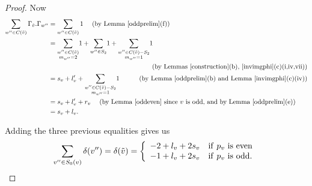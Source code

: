 \begin{proof}
Now
\begin{align*}
 \sum_{w'' \in C({\tilde{v}})} \Gamma_{\tilde{v}}.\Gamma_{w''} 
 &= \sum_{w'' \in C({\tilde{v}})} 1 \ \ \ \ (\mathrm{by \ Lemma~\ref{oddprelim}(f)}) \\
 &= {\sum_{\substack{w'' \in C({\tilde{v}}) \\ m_{w''} = 2 }}} 1 + {\sum_{w'' \in S_2}} 1 + {\sum_{\substack{w'' \in C({\tilde{v}}) \setminus S_2 \\ m_{w''} = 1  }}} 1 \\
 & \pushright{(\textup{by Lemmas~\ref{construction}(b),~\ref{invimgphi}(c)(i,iv,vii)})} \\
 &= s_v+l'_v+{\sum_{\substack{w'' \in C({\tilde{v}}) \setminus S_2 \\ m_{w''} = 1  }}} 1 \ \ \ \ \ \ \ \ \ (\mathrm{by \ Lemma~\ref{oddprelim}(b) \ and \ Lemma~\ref{invimgphi}(c)(iv)}) \\
 &= s_v+l'_v+r_v \ \ \ \ (\textup{by Lemma~\ref{oddeven} since $v$ is odd,  and by  Lemma~\ref{oddprelim}(e)}) \\
 &= s_v+l_v. 
\end{align*}

Adding the three previous equalities gives us
\[ \sum_{v'' \in S_0(v)} \delta(v'') =  \delta(\tilde{v})  =  \left\{ \begin{array}{ll}
-2+l_v+2s_v  &\mathrm{if}\ p_v\ \mathrm{is}\ \mathrm{even} \\                                                                                                                                                                                                                          
-1+l_v+2s_v  &\mathrm{if}\ p_v\ \mathrm{is}\ \mathrm{odd}.  \end{array} \right. \qedhere                                                                                                                                                                                                                        \] 
\end{proof}

